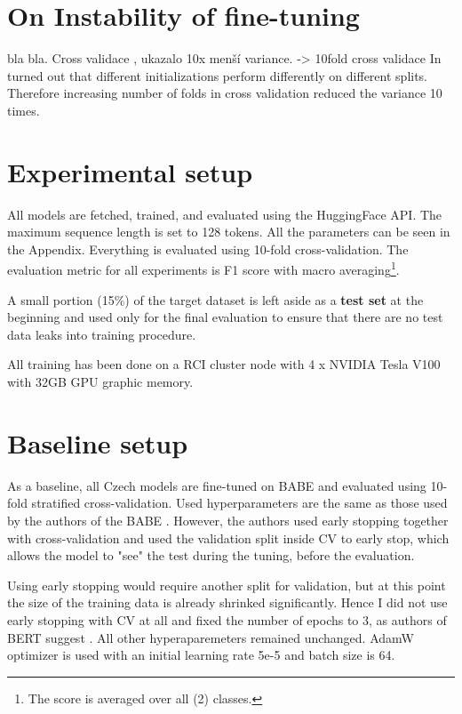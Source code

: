 \section{On Instability of fine-tuning}
bla bla. Cross validace , ukazalo 10x menší variance. -> 10fold cross validace
In turned out that different initializations perform differently on different splits. Therefore increasing number of folds in cross validation reduced the variance 10 times.



\section{Experimental setup}
All models are fetched, trained, and evaluated using the HuggingFace API. The maximum sequence length is set to 128 tokens. All the parameters can be seen in the Appendix.
Everything is evaluated using 10-fold cross-validation. The evaluation metric for all experiments is F1 score with macro averaging\footnote{The score is averaged over all (2) classes.}. 

A small portion (15\%) of the target dataset is left aside as a \textbf{test set} at the beginning and used only for the final evaluation to ensure that there are no test data leaks into training procedure.

All training has been done on a RCI cluster node with 4 x NVIDIA Tesla V100 with 32GB GPU graphic memory.




 \section{Baseline setup}
 As a baseline, all Czech models are fine-tuned on BABE and evaluated using 10-fold stratified cross-validation. Used hyperparameters are the same as those used by the authors of the BABE \cite{Spinde2021MBIC}. However, the authors used early stopping together with cross-validation and used the validation split inside CV to early stop, which allows the model to "see" the test during the tuning, before the evaluation. 
 
 Using early stopping would require another split for validation, but at this point the size of the training data is already shrinked significantly. Hence I did not use early stopping with CV at all and fixed the number of epochs to 3, as authors of BERT suggest \cite{devlin2019bert} . 
 All other hyperaparemeters remained unchanged. AdamW optimizer is used with an initial learning rate 5e-5 and batch size is 64.
 
